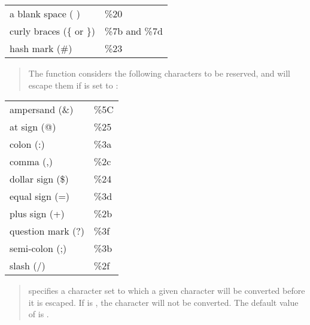 \documentclass[letterpaper,10pt,english,openany,oneside]{sphinxmanual}
\begin{document}
\begin{savenotes}\sphinxattablestart
\centering
\begin{tabulary}{\linewidth}[t]{|T|T|}
\hline
{}\relax &\relax \\
\hline
a blank space ( )
&
\%20
\\
\hline
curly braces (\{ or \})
&
\%7b and \%7d
\\
\hline
hash mark (\#)
&
\%23
\\
\hline
\end{tabulary}
\par
\sphinxattableend\end{savenotes}
\begin{quote}

The  function considers the following characters to be
reserved, and will escape them if  is set to
:
\end{quote}


\begin{savenotes}\sphinxattablestart
\centering
\begin{tabulary}{\linewidth}[t]{|T|T|}
\hline
{}\relax &\relax \\
\hline
ampersand (\&)
&
\%5C
\\
\hline
at sign (@)
&
\%25
\\
\hline
colon (:)
&
\%3a
\\
\hline
comma (,)
&
\%2c
\\
\hline
dollar sign (\$)
&
\%24
\\
\hline
equal sign (=)
&
\%3d
\\
\hline
plus sign (+)
&
\%2b
\\
\hline
question mark (?)
&
\%3f
\\
\hline
semi-colon (;)
&
\%3b
\\
\hline
slash (/)
&
\%2f
\\
\hline
\end{tabulary}
\par
\sphinxattableend\end{savenotes}

\begin{quote}

 specifies a character set to which a given character
will be converted before it is escaped. If  is ,
the character will not be converted. The default value of
 is .
\end{quote}
\end{document}
